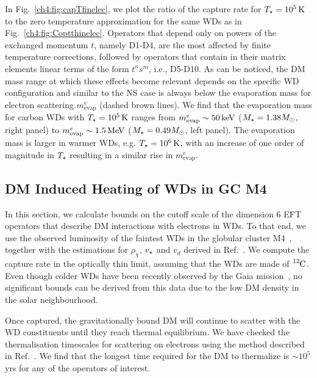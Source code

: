 In Fig.~\ref{ch4:fig:capTfinelec}, we plot the ratio of the capture rate for $T_\star=10^5{\rm \,K}$ to the zero temperature approximation for the same WDs as in Fig.~\ref{ch4:fig:Coptthinelec}. Operators that depend only on powers of the exchanged momentum $t$, namely D1-D4, are the most affected by finite temperature corrections, followed by operators that contain in their matrix elements linear terms of the form $t^n s^m$, i.e., D5-D10. As can be noticed, the DM mass range at which these effects become relevant depends on the specific WD configuration and similar to the NS case is always below the evaporation mass for electron scattering $m_\mathrm{evap}^e$ (dashed brown lines).  We find that the evaporation mass for carbon WDs with  $T_\star=10^5{\rm \,K}$ ranges from $m_\mathrm{evap}^e\sim 50{\rm \,keV}$ ($M_\star=1.38M_\odot$, right panel) to $m_\mathrm{evap}^e\sim 1.5{\rm \,MeV}$ ($M_\star=0.49M_\odot$, left panel). 
The evaporation mass is larger in warmer WDs, e.g. $T_\star=10^6{\rm \,K}$, with an increase of one order of magnitude in $T_\star$ resulting in a similar rise in $m_\mathrm{evap}^e$.  

\subsection{DM Induced Heating of WDs in GC M4}
\label{ch4:subsec:WD_results}




In this section, we calculate bounds on the cutoff scale of the dimension 6 EFT operators that describe DM interactions with electrons in WDs. To that end, we use the observed luminosity of the faintest WDs in the globular cluster M4~\cite{Bedin:2009it_jun_Endwhitedwarf,McCullough:2010ai_CaptureInelasticDark}, together with the estimations for $\rho_\chi$, $v_\star$ and $v_d$ derived in Ref.~\cite{McCullough:2010ai_CaptureInelasticDark}.  We compute the capture rate in the optically thin limit, assuming that the WDs are made of $\ce{^{12}C}$. Even though colder WDs have been recently observed by the Gaia mission~\cite{GentileFusillo_feb_GaiaDataRelease}, no significant bounds can be derived from this data due to the low DM density in the solar neighbourhood. 


Once captured, the gravitationally bound DM will continue to scatter with the WD constituents until they reach thermal equilibrium. We have checked the thermalisation timescales for scattering on electrons using the method described in Ref.~\cite{Bertoni:2013bsa_dec_DarkMatterThermalization}. We find that the longest time required for the DM to thermalize is $\sim 10^{5}$ yrs for any of the operators of interest.

